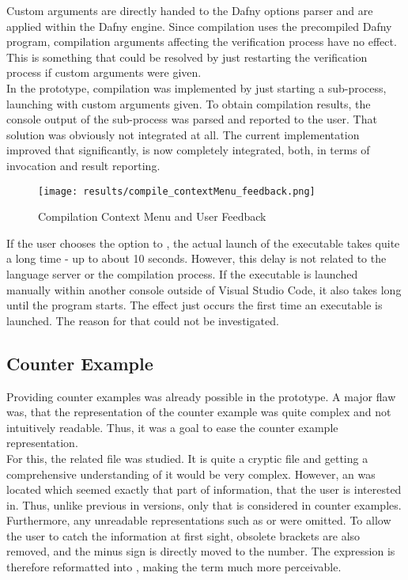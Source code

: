 Custom arguments are directly handed to the Dafny options parser and are applied within the Dafny engine.
Since compilation uses the precompiled Dafny program, compilation arguments affecting the verification process have no effect.
This is something that could be resolved by just restarting the verification process if custom arguments were given.\\

In the prototype, compilation was implemented by just starting a sub-process, launching  with custom arguments given.
To obtain compilation results, the console output of the sub-process was parsed and reported to the user.
That solution was obviously not integrated at all.
The current implementation improved that significantly, is now completely integrated, both, in terms of invocation and result reporting.

\begin{figure}[h]
    \centering
    \texttt{[image: results/compile\_contextMenu\_feedback.png]}
    \caption{Compilation Context Menu and User Feedback}
    \label{fig:compilation_stuff}
\end{figure}


If the user chooses the option to , the actual launch of the executable takes quite a long time - up to about 10 seconds.
However, this delay is not related to the language server or the compilation process.
If the executable is launched manually within another console outside of Visual Studio Code, it also takes long until the program starts.
The effect just occurs the first time an executable is launched.
The reason for that could not be investigated.

\subsection{Counter Example}
Providing counter examples was already possible in the prototype.
A major flaw was, that the representation of the counter example was quite complex and not intuitively readable.
Thus, it was a goal to ease the counter example representation.\\

For this, the related  file was studied.
It is quite a  cryptic file and getting a comprehensive understanding of it would be very complex.
However, an  was located which seemed exactly that part of information, that the user is interested in.
Thus, unlike previous in versions, only that  is considered in counter examples.
Furthermore, any unreadable representations such as  or  were omitted.
To allow the user to catch the information at first sight, obsolete brackets are also removed, and the minus sign is directly moved to the number.
The expression  is therefore reformatted into , making the term much more perceivable.

